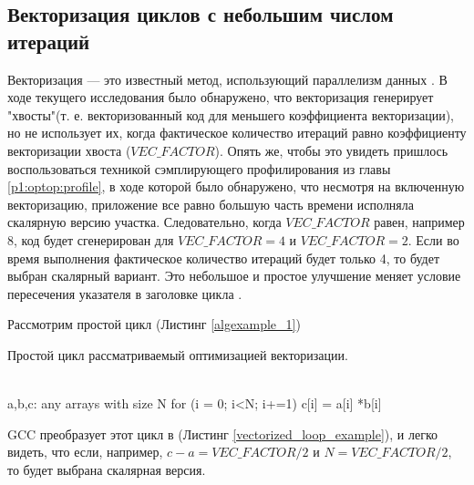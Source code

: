 \subsection {Векторизация циклов с небольшим числом итераций}
Векторизация — это известный метод, использующий параллелизм данных \cite{nuzman2006autovectorization}. В ходе текущего исследования было обнаружено, что векторизация генерирует "хвосты"\phantom{ }(т. е. векторизованный код для меньшего коэффициента векторизации), но не использует их, когда фактическое количество итераций равно коэффициенту векторизации хвоста ($VEC\_FACTOR$). Опять же, чтобы это увидеть пришлось воспользоваться техникой сэмплирующего профилирования из главы \ref{p1:optop:profile}, в ходе которой было обнаружено, что несмотря на включенную векторизацию, приложение все равно большую часть времени исполняла скалярную версию участка. Следовательно, когда $VEC\_FACTOR$ равен, например 8, код будет сгенерирован для $VEC\_FACTOR = 4$ и $VEC\_FACTOR = 2$. Если во время выполнения фактическое количество итераций будет только 4, то будет выбран скалярный вариант. Это небольшое и простое улучшение меняет условие пересечения указателя в заголовке цикла \cite{E240105}.

Рассмотрим простой цикл (Листинг \ref{algexample_1})

\begin{ListingEnv}[!h]
	\captiondelim{ } %
	\caption{Простой цикл рассматриваемый оптимизацией векторизации.}\label{algexample_1}
	\begin{Verb}
		\\ a,b,c: any arrays with size N
		for (i = 0; i<N; i+=1)
		    c[i] = a[i] *b[i]
	\end{Verb}
\end{ListingEnv}
GCC преобразует этот цикл в (Листинг \ref{vectorized_loop_example}), и легко видеть, что если, например, $c-a = VEC\_FACTOR/2$ и $N = VEC\_FACTOR/2$, то будет выбрана скалярная версия.

